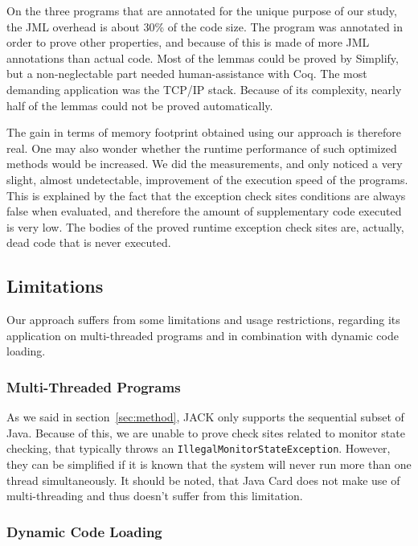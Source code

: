 On the three programs that are annotated for the unique purpose of our study, the JML overhead is about 30\% of the code size. The  program was annotated in order to prove other properties, and because of this is made of more JML annotations than actual code. Most of the lemmas could be proved by Simplify, but a non-neglectable part needed human-assistance with Coq. The most demanding application was the TCP/IP stack. Because of its complexity, nearly half of the lemmas could not be proved automatically.

The gain in terms of memory footprint obtained using our approach is therefore real. One may also wonder whether the runtime performance of such optimized methods would be increased. We did the measurements, and only noticed a very slight, almost undetectable, improvement of the execution speed of the programs. This is explained by the fact that the exception check sites conditions are always false when evaluated, and therefore the amount of supplementary code executed is very low. The bodies of the proved runtime exception check sites are, actually, dead code that is never executed.

\subsection{Limitations}
\label{sec:limitations}

Our approach suffers from some limitations and usage restrictions, regarding its application on multi-threaded programs and in combination with dynamic code loading.

\subsubsection{Multi-Threaded Programs}

As we said in section~\ref{sec:method}, JACK only supports the sequential subset of Java. Because of this, we are unable to prove check sites related to monitor state checking, that typically throws an \texttt{IllegalMonitorStateException}. However, they can be simplified if it is known that the system will never run more than one thread simultaneously. It should be noted, that Java Card does not make use of multi-threading and thus doesn't suffer from this limitation.

\subsubsection{Dynamic Code Loading}

